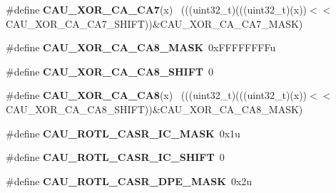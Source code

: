 \begin{DoxyCompactItemize}
\item 
\hypertarget{group___c_a_u___register___masks_ga3e3370b262decaec3ea286d5bf41144b}{}\#define {\bfseries C\+A\+U\+\_\+\+X\+O\+R\+\_\+\+C\+A\+\_\+\+C\+A7}(x)                                            ~(((uint32\+\_\+t)(((uint32\+\_\+t)(x))$<$$<$C\+A\+U\+\_\+\+X\+O\+R\+\_\+\+C\+A\+\_\+\+C\+A7\+\_\+\+S\+H\+I\+F\+T))\&C\+A\+U\+\_\+\+X\+O\+R\+\_\+\+C\+A\+\_\+\+C\+A7\+\_\+\+M\+A\+S\+K)\label{group___c_a_u___register___masks_ga3e3370b262decaec3ea286d5bf41144b}

\item 
\hypertarget{group___c_a_u___register___masks_ga5dae0bacc10008301389f42a02bdd3d4}{}\#define {\bfseries C\+A\+U\+\_\+\+X\+O\+R\+\_\+\+C\+A\+\_\+\+C\+A8\+\_\+\+M\+A\+S\+K}~0x\+F\+F\+F\+F\+F\+F\+F\+Fu\label{group___c_a_u___register___masks_ga5dae0bacc10008301389f42a02bdd3d4}

\item 
\hypertarget{group___c_a_u___register___masks_gab7debaaae0a6137460fd18cf952033ae}{}\#define {\bfseries C\+A\+U\+\_\+\+X\+O\+R\+\_\+\+C\+A\+\_\+\+C\+A8\+\_\+\+S\+H\+I\+F\+T}~0\label{group___c_a_u___register___masks_gab7debaaae0a6137460fd18cf952033ae}

\item 
\hypertarget{group___c_a_u___register___masks_gaa9800fdc6eb90fc805ef431bdbf372ea}{}\#define {\bfseries C\+A\+U\+\_\+\+X\+O\+R\+\_\+\+C\+A\+\_\+\+C\+A8}(x)                                            ~(((uint32\+\_\+t)(((uint32\+\_\+t)(x))$<$$<$C\+A\+U\+\_\+\+X\+O\+R\+\_\+\+C\+A\+\_\+\+C\+A8\+\_\+\+S\+H\+I\+F\+T))\&C\+A\+U\+\_\+\+X\+O\+R\+\_\+\+C\+A\+\_\+\+C\+A8\+\_\+\+M\+A\+S\+K)\label{group___c_a_u___register___masks_gaa9800fdc6eb90fc805ef431bdbf372ea}

\item 
\hypertarget{group___c_a_u___register___masks_ga872c60c9f23d4d48a0f47cd1f3848540}{}\#define {\bfseries C\+A\+U\+\_\+\+R\+O\+T\+L\+\_\+\+C\+A\+S\+R\+\_\+\+I\+C\+\_\+\+M\+A\+S\+K}~0x1u\label{group___c_a_u___register___masks_ga872c60c9f23d4d48a0f47cd1f3848540}

\item 
\hypertarget{group___c_a_u___register___masks_gafe14ff3ce4f7d2b10d0b202cf03546af}{}\#define {\bfseries C\+A\+U\+\_\+\+R\+O\+T\+L\+\_\+\+C\+A\+S\+R\+\_\+\+I\+C\+\_\+\+S\+H\+I\+F\+T}~0\label{group___c_a_u___register___masks_gafe14ff3ce4f7d2b10d0b202cf03546af}

\item 
\hypertarget{group___c_a_u___register___masks_ga834d584c25afb7faf4c9f0b87b5b9619}{}\#define {\bfseries C\+A\+U\+\_\+\+R\+O\+T\+L\+\_\+\+C\+A\+S\+R\+\_\+\+D\+P\+E\+\_\+\+M\+A\+S\+K}~0x2u\label{group___c_a_u___register___masks_ga834d584c25afb7faf4c9f0b87b5b9619}


\end{DoxyCompactItemize}
